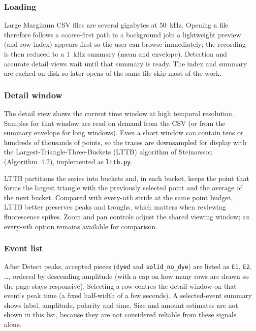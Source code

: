 
\subsubsection{Loading}
Large Marginum CSV files are several gigabytes at \SI{50}{\kilo\hertz}. Opening a file
therefore follows a coarse-first path in a background job: a lightweight preview (and row
index) appears first so the user can browse immediately; the recording is then reduced to a
\SI{1}{\kilo\hertz} summary (mean and envelope). Detection and accurate detail views wait
until that summary is ready. The index and summary are cached on disk so later opens of the
same file skip most of the work.

\subsubsection{Detail window}
The detail view shows the current time window at high temporal resolution. Samples for that
window are read on demand from the CSV (or from the summary envelope for long windows). Even
a short window can contain tens or hundreds of thousands of points, so the traces are
downsampled for display with the Largest-Triangle-Three-Buckets (LTTB) algorithm of
Steinarsson~\cite{steinarsson2013} (Algorithm~4.2), implemented as \texttt{lttb.py}.

LTTB partitions the series into buckets and, in each bucket, keeps the point that forms the
largest triangle with the previously selected point and the average of the next bucket.
Compared with every-$n$th stride at the same point budget, LTTB better preserves peaks and
troughs, which matters when reviewing fluorescence spikes. Zoom and pan controls adjust the
shared viewing window; an every-$n$th option remains available for comparison.

\subsubsection{Event list}
After Detect peaks, accepted pieces (\texttt{dyed} and \texttt{solid\_no\_dye}) are listed as
\texttt{E1}, \texttt{E2}, \ldots, ordered by descending amplitude (with a cap on how many
rows are drawn so the page stays responsive). Selecting a row centres the detail window on
that event's peak time (a fixed half-width of a few seconds). A selected-event summary shows
label, amplitude, polarity and time. Size and amount estimates are not shown in this list,
because they are not considered reliable from these signals alone.
